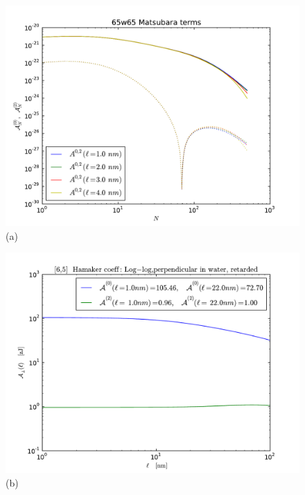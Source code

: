 \documentclass[onecolumn,letterpaper,amsmath,amssymb,floatfix,aps,superscriptaddress]{revtex4}
\begin{document}
\begin{figure}[t!]
\begin{center}
\begin{minipage}[b]{0.40\textwidth}
\begin{center}
\includegraphics[width=1.2\textwidth]{plots/65_A_vs_n.pdf} (a)
\end{center}
\end{minipage}
\hskip 43pt
\begin{minipage}[b]{0.40\textwidth}
\begin{center}
\includegraphics[width=1.2\textwidth]{plots/140322_65w65_HCs_perpendicular_ret.pdf} (b)
\end{center}

\end{minipage}
\end{center}
\end{figure}
\end{document}
